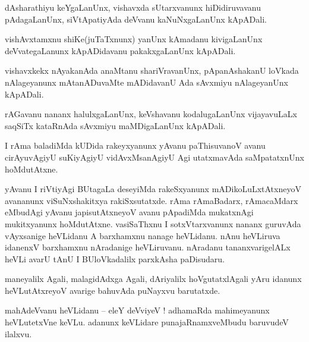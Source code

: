 \documentclass{article}
\begin{document}
\begin{mn}%
dAsharathiyu keYgaLanUnx, vishavxda sUtarxvanunx hiDidiruvavanu pAdagaLanUnx, siVtApatiyAda deVvanu 
kaNuNxgaLanUnx kApADali.
\end{mn}

\begin{mn}%
vishAvxtamxnu shiKe(juTaTxnunx) yanUnx kAmadanu kivigaLanUnx deVvategaLanunx kApADidavanu 
pakakxgaLanUnx kApADali.
\end{mn}

\begin{mn}%
vishavxkekx nAyakanAda anaMtanu shariVravanUnx, pApanAshakanU loVkada nAlageyanunx mAtanADuvaMte 
mADidavanU Ada sAvxmiyu nAlageyanUnx kApADali.
\end{mn}

\begin{mn}%
rAGavanu nananx halulxgaLanUnx, keVshavanu kodalugaLanUnx vijayavuLaLx saqSiTx kataRnAda sAvxmiyu 
maMDigaLanUnx kApADali.
\end{mn}

\begin{mn}%
I rAma baladiMda kUDida rakeyxyanunx yAvanu paThisuvanoV avanu cirAyuvAgiyU suKiyAgiyU 
vidAvxMsanAgiyU Agi utatxmavAda saMpatatxnUnx hoMdutAtxne.
\end{mn}

\begin{mn}%
yAvanu I riVtiyAgi BUtagaLa deseyiMda rakeSxyanunx mADikoLuLxtAtxneyoV avananunx viSuNxshakitxya 
rakiSxsutatxde. rAma rAmaBadarx, rAmacaMdarx eMbudAgi yAvanu japisutAtxneyoV avanu pApadiMda 
mukatxnAgi mukitxyanunx hoMdutAtxne. vasiSaThxnu I sotxVtarxvanunx nananx guruvAda vAyxsanige 
heVLidanu A barxhamxnu nanage heVLidanu. nAnu heVLiruva idanenxV barxhamxnu nAradanige heVLiruvanu.
nAradanu tananxvarigelALx heVLi avarU tAnU I BUloVkadalilx parxkAsha paDisudaru.
\end{mn}

\begin{mn}%
maneyalilx Agali, malagidAdxga Agali, dAriyalilx hoVgutatxlAgali yAru idanunx heVLutAtxreyoV 
avarige bahuvAda puNayxvu barutatxde.
\end{mn}


\begin{mn}%
mahAdeVvanu heVLidanu -- eleY deVviyeV ! adhamaRda mahimeyanunx heVLutetxVne keVLu. adanunx 
keVLidare punajaRnamxveMbudu baruvudeV ilalxvu.
\end{mn}
\end{document}
